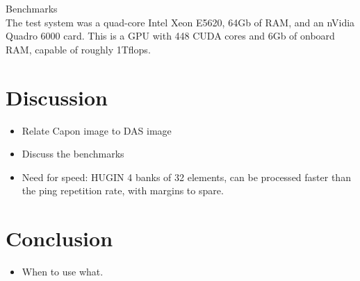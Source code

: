 \documentclass[10pt,a4paper]{article}
\newcommand\1{\vec 1}
\renewcommand\gls[1]{#1}
\begin{document}
Benchmarks\\
The test system was a quad-core Intel Xeon E5620, 64Gb of \gls{RAM}, and an nVidia Quadro 6000 card. This is a \gls{GPU} with 448 \gls{CUDA} cores and 6Gb of onboard \gls{RAM}, capable of roughly 1Tflops.


\section{Discussion}

\begin{itemize}
\item Relate Capon image to DAS image
\item Discuss the benchmarks
\item Need for speed: HUGIN 4 banks of 32 elements, can be processed faster than the ping repetition rate, with margins to spare.
\end{itemize}


\section{Conclusion}

\begin{itemize}
\item When to use what.
\end{itemize}



\end{document}
